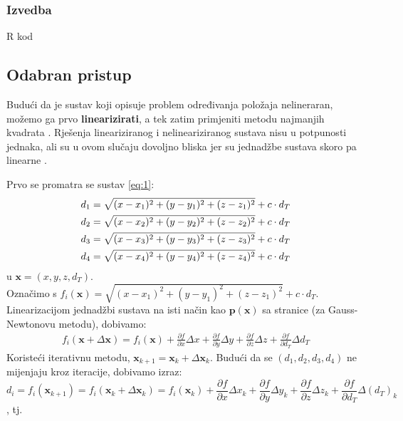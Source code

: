 \documentclass[a4paper,twoside,12pt]{memoir} %
\begin{document}
\subsubsection{Izvedba}
R kod

\subsection{Odabran pristup}
Budući da je sustav koji opisuje problem određivanja položaja nelineraran, 
možemo ga prvo \textbf{linearizirati}, a tek zatim primjeniti metodu najmanjih kvadrata \cite{googleSchoolar1}.
Rješenja lineariziranog i nelineariziranog sustava nisu u potpunosti jednaka, ali su u ovom slučaju dovoljno bliska jer su jednadžbe sustava skoro pa linearne \cite{singer07}.%

Prvo se promatra se sustav \ref{eq:1}:
\begin{align}\label{eq:1partial}
d_1 = \sqrt{(x-x_1)^{2}+(y-y_1)^{2}+(z-z_1)^{2}} + c\cdot d_T \notag \\
d_2 = \sqrt{(x-x_2)^{2}+(y-y_2)^{2}+(z-z_2)^{2}} + c\cdot d_T  \\
d_3 = \sqrt{(x-x_3)^{2}+(y-y_3)^{2}+(z-z_3)^{2}} + c\cdot d_T \notag \\
d_4 = \sqrt{(x-x_4)^{2}+(y-y_4)^{2}+(z-z_4)^{2}} + c\cdot d_T \notag
\end{align}
u $\mathbf{x} = (x,y,z,d_T)$.\\
Označimo s $f_i(\mathbf{x}) = \sqrt{(x-x_1)^{2}+(y-y_1)^{2}+(z-z_1)^{2}} + c\cdot d_T$.\\
Linearizacijom jednadžbi sustava na isti način kao $\mathbf{p}(\mathbf{x})$ sa stranice \pageref{stranica:NGLin} (za Gauss-Newtonovu metodu), dobivamo:
\begin{align*}
f_i(\mathbf{x} + \Delta\mathbf{x}) = f_i(\mathbf{x}) + \frac{\partial f}{\partial x}\Delta x + \frac{\partial f}{\partial y}\Delta y + \frac{\partial f}{\partial z}\Delta z + \frac{\partial f}{\partial d_T}\Delta d_T 
\end{align*}
Koristeći iterativnu metodu, $\mathbf{x}_{k+1} = \mathbf{x}_k+\Delta\mathbf{x}_k$.
Budući da se $(d_1,d_2,d_3,d_4)$ ne mijenjaju kroz iteracije, dobivamo izraz:
$$
d_i = f_i(\mathbf{x}_{k+1}) = f_i(\mathbf{x}_{k} + \Delta\mathbf{x}_{k}) = f_i(\mathbf{x}_{k}) + \frac{\partial f}{\partial x}\Delta x_k + \frac{\partial f}{\partial y}\Delta y_k + \frac{\partial f}{\partial z}\Delta z_k + \frac{\partial f}{\partial d_T}\Delta (d_T)_k 
$$, tj.
\end{document}
